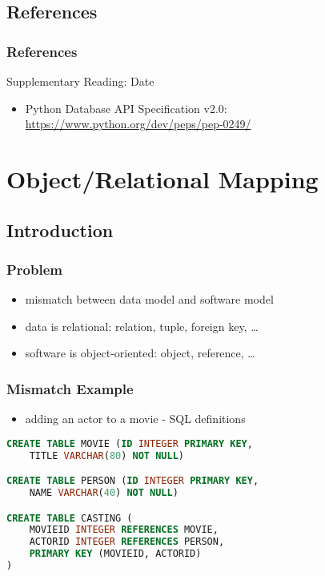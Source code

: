 \documentclass[dvipsnames]{beamer}
\theoremstyle{plain}
\begin{document}
\subsection*{References}

\begin{frame}
  \frametitle{References}

  \begin{block}{Supplementary Reading: Date}
    \begin{itemize}

    \item Python Database API Specification v2.0:\\
      \url{https://www.python.org/dev/peps/pep-0249/}
    \end{itemize}
  \end{block}
\end{frame}

\section{Object/Relational Mapping}

\subsection{Introduction}

\begin{frame}
  \frametitle{Problem}

  \begin{itemize}
    \item mismatch between data model and software model

    \medskip
    \item data is relational: relation, tuple, foreign key, \ldots
    \item software is object-oriented: object, reference, \ldots
  \end{itemize}
\end{frame}

\begin{frame}[fragile]
  \frametitle{Mismatch Example}

  \begin{itemize}
    \item adding an actor to a movie - SQL definitions
  \end{itemize}

  \begin{lstlisting}[language=SQL]
CREATE TABLE MOVIE (ID INTEGER PRIMARY KEY,
    TITLE VARCHAR(80) NOT NULL)

CREATE TABLE PERSON (ID INTEGER PRIMARY KEY,
    NAME VARCHAR(40) NOT NULL)

CREATE TABLE CASTING (
    MOVIEID INTEGER REFERENCES MOVIE,
    ACTORID INTEGER REFERENCES PERSON,
    PRIMARY KEY (MOVIEID, ACTORID)
)
  \end{lstlisting}
\end{frame}
\end{document}
